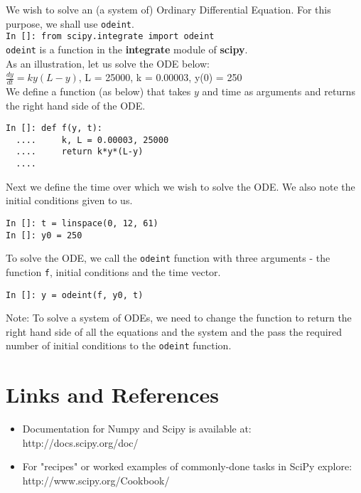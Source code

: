 \documentclass[12pt]{article}
\newcommand{\typ}[1]{\lstinline{#1}}
\begin{document}
We wish to solve an (a system of) Ordinary Differential Equation. For this purpose, we shall use \typ{odeint}.\\
\typ{In []: from scipy.integrate import odeint}\\
\typ{odeint} is a function in the \textbf{integrate} module of \textbf{scipy}.\\
As an illustration, let us solve the ODE below:\\
$\frac{dy}{dt} = ky(L-y)$, L = 25000, k = 0.00003, y(0) = 250\\
We define a function (as below) that takes $y$ and time as arguments and returns the right hand side of the ODE.
\begin{lstlisting}
In []: def f(y, t):
  ....     k, L = 0.00003, 25000
  ....     return k*y*(L-y)
  ....
\end{lstlisting}
Next we define the time over which we wish to solve the ODE. We also note the initial conditions given to us.
\begin{lstlisting}
In []: t = linspace(0, 12, 61)
In []: y0 = 250
\end{lstlisting}
To solve the ODE, we call the \typ{odeint} function with three arguments - the function \typ{f}, initial conditions and the time vector. 
\begin{lstlisting}
In []: y = odeint(f, y0, t)
\end{lstlisting}
Note: To solve a system of ODEs, we need to change the function to return the right hand side of all the equations and the system and the pass the required number of initial conditions to the \typ{odeint} function.
\section{Links and References}
\begin{itemize}
\item Documentation for Numpy and Scipy is available at:\\ http://docs.scipy.org/doc/
  \item For "recipes" or worked examples of commonly-done tasks in SciPy explore: \\ http://www.scipy.org/Cookbook/
\end{itemize}
\end{document}
